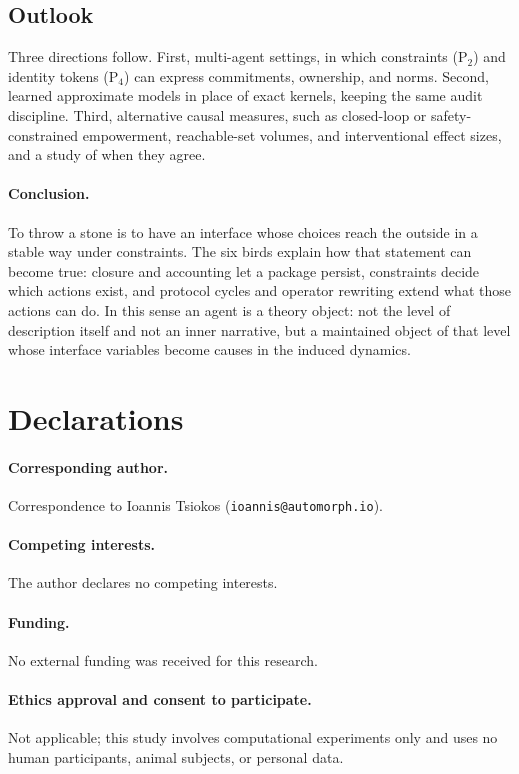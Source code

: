\subsection{Outlook}
Three directions follow. First, multi-agent settings, in which constraints (P$_2$) and identity tokens (P$_4$) can express commitments, ownership, and norms. Second, learned approximate models in place of exact kernels, keeping the same audit discipline. Third, alternative causal measures, such as closed-loop or safety-constrained empowerment, reachable-set volumes, and interventional effect sizes, and a study of when they agree.

\paragraph{Conclusion.}
To throw a stone is to have an interface whose choices reach the outside in a stable way under constraints. The six birds explain how that statement can become true: closure and accounting let a package persist, constraints decide which actions exist, and protocol cycles and operator rewriting extend what those actions can do. In this sense an agent is a theory object: not the level of description itself and not an inner narrative, but a maintained object of that level whose interface variables become causes in the induced dynamics.

\section*{Declarations}

\paragraph{Corresponding author.}
Correspondence to Ioannis Tsiokos (\texttt{ioannis@automorph.io}).

\paragraph{Competing interests.}
The author declares no competing interests.

\paragraph{Funding.}
No external funding was received for this research.

\paragraph{Ethics approval and consent to participate.}
Not applicable; this study involves computational experiments only and uses no human participants, animal subjects, or personal data.


